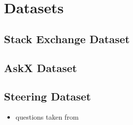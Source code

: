 \chapter{Datasets}%
\label{sec:datasets}

\section{Stack Exchange Dataset}%
\label{sec:datasets:stackex}


\section{AskX Dataset}%
\label{sec:datasets:askx}


\section{Steering Dataset}%
\label{sec:datasets:steering}
\begin{itemize}
  \item questions taken from \citet{petroni-etal-2021-kilt,rooeinKnowYourAudience2023}
\end{itemize}
